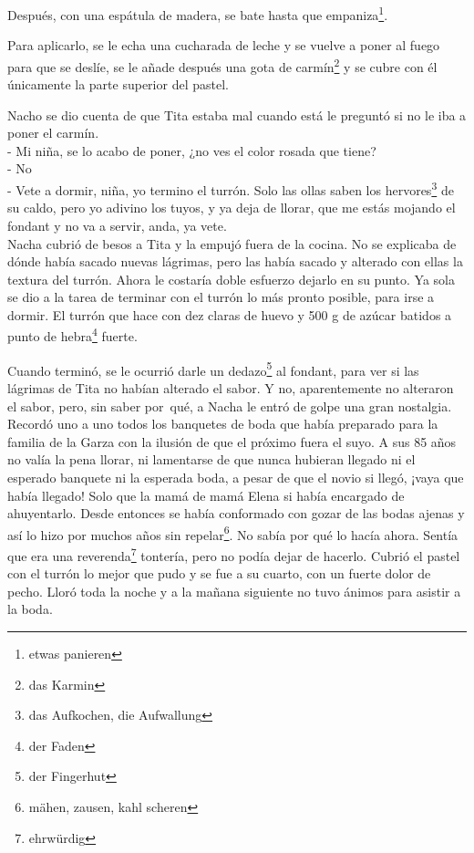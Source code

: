 Después, con una espátula de madera, se bate hasta que empaniza\footnote{etwas panieren}.

Para aplicarlo, se le echa una cucharada de leche y se vuelve a poner al
fuego para que se deslíe,
se le añade después una gota de carmín\footnote{das Karmin} y se
cubre con él únicamente la parte superior del pastel.

Nacho se dio cuenta de que Tita estaba mal cuando está le preguntó si
no le iba a poner el carmín.
\\- Mi niña, se lo acabo de poner, ¿no ves el color rosada que tiene? %
\\- No \ndots %
\\- Vete a dormir, niña, yo termino el turrón. Solo las ollas saben los hervores\footnote{das Aufkochen, die Aufwallung} de su caldo, %
pero yo adivino los tuyos, y ya deja de llorar, %
que me estás mojando el fondant y no va a servir, anda, ya vete.\\

Nacha cubrió de besos a Tita y la empujó fuera de la cocina. No se
explicaba de dónde había sacado nuevas lágrimas, pero las había sacado y
alterado con ellas la textura del turrón. Ahora le costaría doble
esfuerzo dejarlo en su punto. Ya sola se dio a la tarea de terminar con
el turrón lo más pronto posible, para irse a dormir. El turrón que hace
con dez claras de huevo y 500 g de azúcar batidos a punto de hebra\footnote{der Faden}
fuerte.

Cuando terminó, se le ocurrió darle un dedazo\footnote{der Fingerhut} al fondant, para ver si
las lágrimas de Tita no habían alterado el sabor. Y no, aparentemente no
alteraron el sabor, pero, sin saber por~qué, a Nacha le entró de
golpe una gran nostalgia. Recordó uno a uno todos los banquetes de boda
que había preparado para la familia de la Garza con la ilusión de que el
próximo fuera el suyo. A sus 85 años no valía la pena llorar, ni
lamentarse de que nunca hubieran llegado ni el esperado banquete ni la
esperada boda, a pesar de que el novio si llegó, ¡vaya que había llegado!
Solo que la mamá de mamá Elena si había encargado de ahuyentarlo. Desde
entonces se había conformado con gozar de las bodas ajenas y así lo hizo
por muchos años sin repelar\footnote{mähen, zausen, kahl scheren}. No sabía por qué lo hacía ahora. Sentía que
era una reverenda\footnote{ehrwürdig} tontería, pero no podía
dejar de hacerlo. Cubrió el pastel con el turrón lo mejor que pudo y se
fue a su cuarto, con un fuerte dolor de pecho. Lloró toda la noche y a
la mañana siguiente no tuvo ánimos para asistir a la boda.


